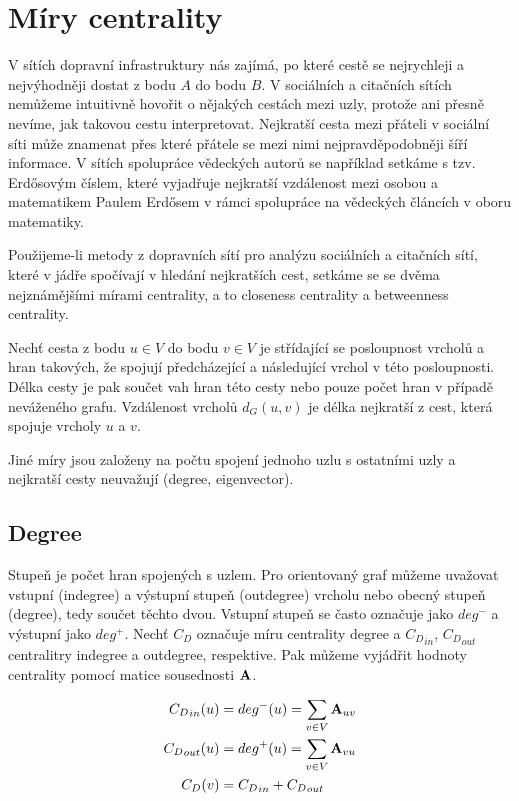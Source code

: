 \documentclass{bakalarka}
\begin{document}
\section{Míry centrality}
V sítích dopravní infrastruktury nás zajímá, po které cestě se nejrychleji a
nejvýhodněji dostat z bodu $A$ do bodu $B$. V sociálních a citačních sítích
nemůžeme intuitivně hovořit o nějakých cestách mezi uzly, protože ani přesně
nevíme, jak takovou cestu interpretovat. Nejkratší cesta mezi přáteli v
sociální síti může znamenat přes které přátele se mezi nimi nejpravděpodobněji
šíří informace. V sítích spolupráce vědeckých autorů se například setkáme s
tzv. Erdősovým číslem, které vyjadřuje nejkratší vzdálenost mezi osobou a
matematikem Paulem Erdősem v rámci spolupráce na vědeckých článcích v oboru
matematiky.

Použijeme-li metody z dopravních sítí pro analýzu sociálních a citačních sítí,
které v jádře spočívají v hledání nejkratších cest, setkáme se se dvěma
nejznámějšími mírami centrality, a to closeness centrality a betweenness
centrality.

Nechť cesta z bodu $u \in V$ do bodu $v \in V$ je střídající se posloupnost
vrcholů a hran takových, že spojují předcházející a následující vrchol v této
posloupnosti. Délka cesty je pak součet vah hran této cesty nebo pouze počet
hran v případě neváženého grafu. Vzdálenost vrcholů $d_G(u, v)$ je délka
nejkratší z cest, která spojuje vrcholy $u$ a $v$.

Jiné míry jsou založeny na počtu spojení jednoho uzlu s ostatními uzly a
nejkratší cesty neuvažují (degree, eigenvector).


\subsection{Degree}
Stupeň je počet hran spojených s uzlem. Pro orientovaný graf můžeme uvažovat
vstupní (indegree) a výstupní stupeň (outdegree) vrcholu nebo obecný stupeň
(degree), tedy součet těchto dvou. Vstupní stupeň se často označuje jako
$deg^-$ a výstupní jako $deg^+$. Nechť $C_D$ označuje míru centrality degree a
${C_D}_{in}$, ${C_D}_{out}$ centralitry indegree a outdegree, respektive. Pak
můžeme vyjádřit hodnoty centrality pomocí matice sousednosti ${\bf A}$.

\begin{align}
\label{eq:degree}
{C_D}_{in}(u) &= deg^-(u)  = \displaystyle\sum\limits_{v \in V} {\bf A}_{uv} \\
{C_D}_{out}(u) &= deg^+(u) = \displaystyle\sum\limits_{v \in V} {\bf A}_{vu} \\
{C_D}(v) &= {C_D}_{in} + {C_D}_{out}
\end{align}
\end{document}
